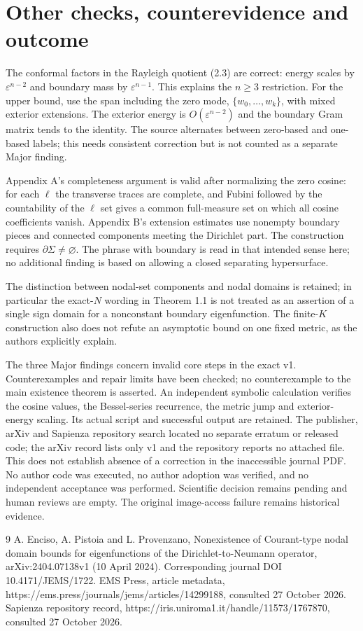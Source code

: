 \documentclass[10pt]{article}
\begin{document}
\section*{Other checks, counterevidence and outcome}
The conformal factors in the Rayleigh quotient (2.3) are correct: energy scales by \(\varepsilon^{n-2}\) and boundary mass by \(\varepsilon^{n-1}\). This explains the \(n\geq3\) restriction. For the upper bound, use the span including the zero mode, \(\{w_0,\ldots,w_k\}\), with mixed exterior extensions. The exterior energy is \(O(\varepsilon^{n-2})\) and the boundary Gram matrix tends to the identity. The source alternates between zero-based and one-based labels; this needs consistent correction but is not counted as a separate Major finding.\par
Appendix A’s completeness argument is valid after normalizing the zero cosine: for each \(\ell\) the transverse traces are complete, and Fubini followed by the countability of the \(\ell\) set gives a common full-measure set on which all cosine coefficients vanish. Appendix B’s extension estimates use nonempty boundary pieces and connected components meeting the Dirichlet part. The construction requires \(\partial\Sigma\ne\varnothing\). The phrase with boundary is read in that intended sense here; no additional finding is based on allowing a closed separating hypersurface.\par
The distinction between nodal-set components and nodal domains is retained; in particular the exact-\(N\) wording in Theorem 1.1 is not treated as an assertion of a single sign domain for a nonconstant boundary eigenfunction. The finite-\(K\) construction also does not refute an asymptotic bound on one fixed metric, as the authors explicitly explain.\par
The three Major findings concern invalid core steps in the exact v1. Counterexamples and repair limits have been checked; no counterexample to the main existence theorem is asserted. An independent symbolic calculation verifies the cosine values, the Bessel-series recurrence, the metric jump and exterior-energy scaling. Its actual script and successful output are retained. The publisher, arXiv and Sapienza repository search located no separate erratum or released code; the arXiv record lists only v1 and the repository reports no attached file. This does not establish absence of a correction in the inaccessible journal PDF. No author code was executed, no author adoption was verified, and no independent acceptance was performed. Scientific decision remains pending and human reviews are empty. The original image-access failure remains historical evidence.\par
9 A. Enciso, A. Pistoia and L. Provenzano, Nonexistence of Courant-type nodal domain bounds for eigenfunctions of the Dirichlet-to-Neumann operator, arXiv:2404.07138v1 (10 April 2024). Corresponding journal DOI 10.4171/JEMS/1722. EMS Press, article metadata, https://ems.press/journals/jems/articles/14299188, consulted 27 October 2026. Sapienza repository record, https://iris.uniroma1.it/handle/11573/1767870, consulted 27 October 2026.\par
\end{document}
